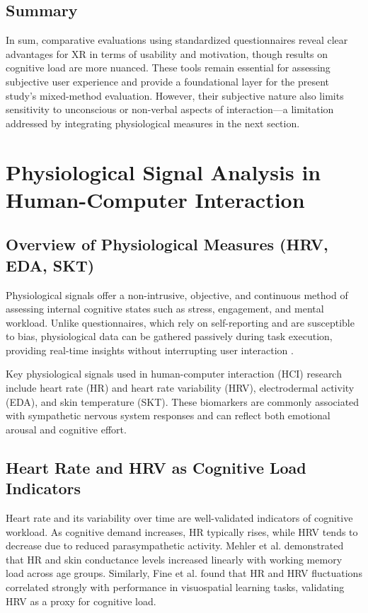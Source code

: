 \documentclass{CPP}
\begin{document}
\subsection{Summary}

In sum, comparative evaluations using standardized questionnaires reveal clear advantages for XR in terms of usability and motivation, though results on cognitive load are more nuanced. These tools remain essential for assessing subjective user experience and provide a foundational layer for the present study’s mixed-method evaluation. However, their subjective nature also limits sensitivity to unconscious or non-verbal aspects of interaction—a limitation addressed by integrating physiological measures in the next section.


\section{Physiological Signal Analysis in Human-Computer Interaction}

\subsection{Overview of Physiological Measures (HRV, EDA, SKT)}

Physiological signals offer a non-intrusive, objective, and continuous method of assessing internal cognitive states such as stress, engagement, and mental workload. Unlike questionnaires, which rely on self-reporting and are susceptible to bias, physiological data can be gathered passively during task execution, providing real-time insights without interrupting user interaction \citep{Chen2016}.

Key physiological signals used in human-computer interaction (HCI) research include heart rate (HR) and heart rate variability (HRV), electrodermal activity (EDA), and skin temperature (SKT). These biomarkers are commonly associated with sympathetic nervous system responses and can reflect both emotional arousal and cognitive effort.

\subsection{Heart Rate and HRV as Cognitive Load Indicators}

Heart rate and its variability over time are well-validated indicators of cognitive workload. As cognitive demand increases, HR typically rises, while HRV tends to decrease due to reduced parasympathetic activity. Mehler et al. \citep{Mehler2012} demonstrated that HR and skin conductance levels increased linearly with working memory load across age groups. Similarly, Fine et al. \citep{Fine2022} found that HR and HRV fluctuations correlated strongly with performance in visuospatial learning tasks, validating HRV as a proxy for cognitive load.
\end{document}
